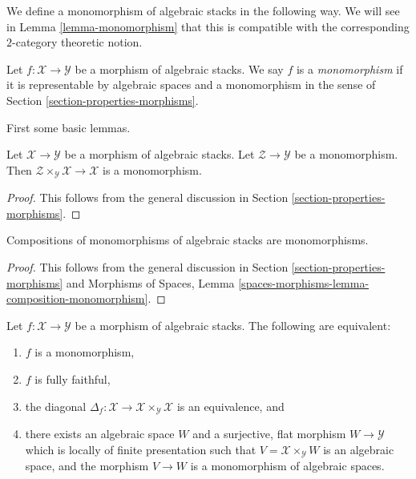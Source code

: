 \noindent
We define a monomorphism of algebraic stacks in the following way.
We will see in
Lemma \ref{lemma-monomorphism}
that this is compatible with the corresponding $2$-category theoretic notion.

\begin{definition}
\label{definition-monomorphism}
Let $f : \mathcal{X} \to \mathcal{Y}$ be a morphism of algebraic stacks.
We say $f$ is a {\it monomorphism}
if it is representable by algebraic spaces and a monomorphism in the sense of
Section \ref{section-properties-morphisms}.
\end{definition}

\noindent
First some basic lemmas.

\begin{lemma}
\label{lemma-base-change-monomorphism}
Let $\mathcal{X} \to \mathcal{Y}$ be a morphism of algebraic stacks.
Let $\mathcal{Z} \to \mathcal{Y}$ be a monomorphism.
Then $\mathcal{Z} \times_\mathcal{Y} \mathcal{X} \to \mathcal{X}$
is a monomorphism.
\end{lemma}

\begin{proof}
This follows from the general discussion in
Section \ref{section-properties-morphisms}.
\end{proof}

\begin{lemma}
\label{lemma-composition-monomorphism}
Compositions of monomorphisms of algebraic stacks are monomorphisms.
\end{lemma}

\begin{proof}
This follows from the general discussion in
Section \ref{section-properties-morphisms}
and
Morphisms of Spaces,
Lemma \ref{spaces-morphisms-lemma-composition-monomorphism}.
\end{proof}

\begin{lemma}
\label{lemma-monomorphism}
Let $f : \mathcal{X} \to \mathcal{Y}$ be a morphism of algebraic stacks.
The following are equivalent:
\begin{enumerate}
\item $f$ is a monomorphism,
\item $f$ is fully faithful,
\item the diagonal
$\Delta_f : \mathcal{X} \to \mathcal{X} \times_\mathcal{Y} \mathcal{X}$
is an equivalence, and
\item there exists an algebraic space $W$ and a surjective, flat morphism
$W \to \mathcal{Y}$ which is locally of finite presentation such that
$V = \mathcal{X} \times_\mathcal{Y} W$ is an algebraic space, and the
morphism $V \to W$ is a monomorphism of algebraic spaces.
\end{enumerate}
\end{lemma}

